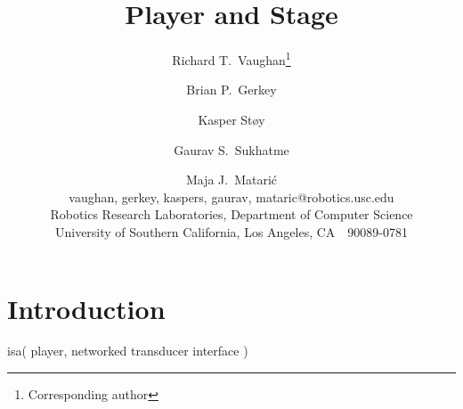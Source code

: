 \documentclass[]{article}
\newcommand{\kasper}{{Kasper St{\o}y}}
\newcommand{\richard}{{Richard T.~Vaughan}}
\newcommand{\gaurav}{{Gaurav S.~Sukhatme}}
\newcommand{\maja}{{Maja J.~Matari\'{c}}}
\newcommand{\brian}{{Brian P.~Gerkey}}
\begin{document}

\title{ Player and Stage }

\author{\richard \thanks{Corresponding author} 
\and \brian \and \kasper \and \gaurav \and \maja 
\vspace{2mm} \\ 
{\small vaughan, gerkey, kaspers, gaurav, mataric@robotics.usc.edu} 
\vspace{2mm} \\
Robotics Research Laboratories, Department of Computer Science\\
University of Southern California, Los Angeles, CA~~90089-0781
}

\maketitle

\begin{abstract}

\end{abstract}

\section{Introduction}

isa( player, networked transducer interface )\\
\end{document}
